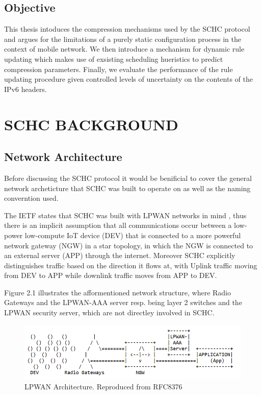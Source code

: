 \documentclass[12pt]{dalthesis}
\begin{document}
	\section{Objective}
	\par{
		This thesis intoduces the compression mechanisms used by the SCHC protocol and argues for the limitations of a purely static 
		configuration process in the context of mobile network. We then introduce a mechanism for dynamic rule updating
		which makes use of exsisting scheduling hueristics to predict compression parameters. Finally, we evaluate the performance 
		of the rule updating procedure given controlled levels of uncertainty on the contents of the IPv6 headers.
	}


\chapter{SCHC BACKGROUND}

\section{Network Architecture}
\par{
		Before discussing the SCHC protocol it would be benificial to cover the general 
		network archeticture that SCHC was built to operate on as well as the naming converntion
		used. 
	}

	\par{
		The IETF states that SCHC was built with LPWAN networks in mind \cite{rfc8724}, 
		thus there is an implicit assumption that all communications occur between
		a low-power low-compute IoT device (DEV) that is connected to a more powerful network gateway (NGW) in a star topology, in which
		the NGW is connected to an external server (APP) through the internet. Moreover SCHC explicitly distinguishes traffic based on the 
		direction it flows at, with Uplink traffic moving from DEV to APP while downlink traffic moves from APP to DEV.


	}
	\par{Figure 2.1 illustrates the afformentioned network structure, where
		Radio Gateways and the LPWAN-AAA server resp. being layer 2 switches and the LPWAN security server, which are not directley involved
		in SCHC.
	}

	\begin{figure}[h]
		\centering
		\includegraphics[width=400pt]{images/network.png}
		\caption{LPWAN Architecture. Reproduced from RFC8376 \cite{rfc8376}}
	\end{figure}
\end{document}
